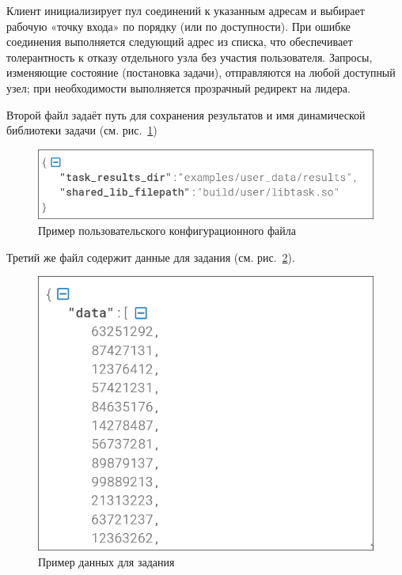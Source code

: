 Клиент инициализирует пул соединений к указанным адресам и выбирает рабочую
«точку входа» по порядку (или по доступности). При ошибке соединения
выполняется следующий адрес из списка, что обеспечивает толерантность к отказу
отдельного узла без участия пользователя. Запросы, изменяющие состояние
(постановка задачи), отправляются на любой доступный узел; при необходимости
выполняется прозрачный редирект на лидера.

Второй файл задаёт путь для сохранения результатов и имя динамической
библиотеки задачи (см. рис.~\ref{fig:user_config})

\begin{figure}
  \centering
  \includegraphics[scale=0.4]{inc/user-config.png}
  \caption{Пример пользовательского конфигурационного файла}
  \label{fig:user_config}
\end{figure}

Третий же файл содержит данные для задания (см. рис.~\ref{fig:user_data}).

\begin{figure}
  \centering
  \includegraphics[scale=0.4]{inc/user-data.png}
  \caption{Пример данных для задания}
  \label{fig:user_data}
\end{figure}

